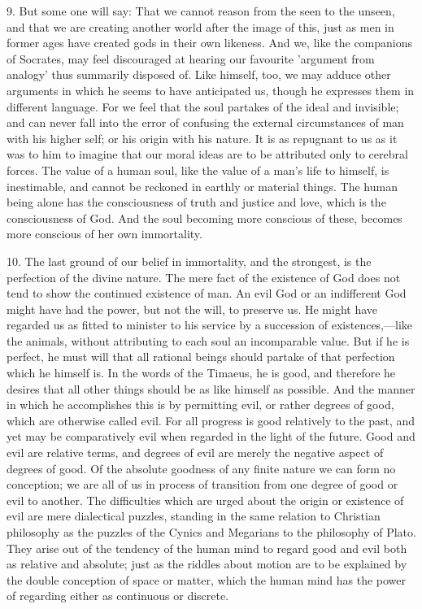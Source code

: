 \documentclass[11pt,letter]{article}
\begin{document}
\par  9. But some one will say: That we cannot reason from the seen to the unseen, and that we are creating another world after the image of this, just as men in former ages have created gods in their own likeness. And we, like the companions of Socrates, may feel discouraged at hearing our favourite 'argument from analogy' thus summarily disposed of. Like himself, too, we may adduce other arguments in which he seems to have anticipated us, though he expresses them in different language. For we feel that the soul partakes of the ideal and invisible; and can never fall into the error of confusing the external circumstances of man with his higher self; or his origin with his nature. It is as repugnant to us as it was to him to imagine that our moral ideas are to be attributed only to cerebral forces. The value of a human soul, like the value of a man's life to himself, is inestimable, and cannot be reckoned in earthly or material things. The human being alone has the consciousness of truth and justice and love, which is the consciousness of God. And the soul becoming more conscious of these, becomes more conscious of her own immortality.

\par  10. The last ground of our belief in immortality, and the strongest, is the perfection of the divine nature. The mere fact of the existence of God does not tend to show the continued existence of man. An evil God or an indifferent God might have had the power, but not the will, to preserve us. He might have regarded us as fitted to minister to his service by a succession of existences,—like the animals, without attributing to each soul an incomparable value. But if he is perfect, he must will that all rational beings should partake of that perfection which he himself is. In the words of the Timaeus, he is good, and therefore he desires that all other things should be as like himself as possible. And the manner in which he accomplishes this is by permitting evil, or rather degrees of good, which are otherwise called evil. For all progress is good relatively to the past, and yet may be comparatively evil when regarded in the light of the future. Good and evil are relative terms, and degrees of evil are merely the negative aspect of degrees of good. Of the absolute goodness of any finite nature we can form no conception; we are all of us in process of transition from one degree of good or evil to another. The difficulties which are urged about the origin or existence of evil are mere dialectical puzzles, standing in the same relation to Christian philosophy as the puzzles of the Cynics and Megarians to the philosophy of Plato. They arise out of the tendency of the human mind to regard good and evil both as relative and absolute; just as the riddles about motion are to be explained by the double conception of space or matter, which the human mind has the power of regarding either as continuous or discrete.
\end{document}
